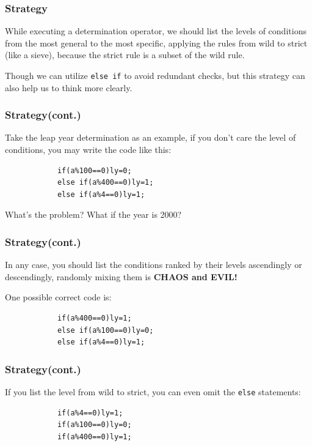\documentclass[xcolor=dvipsnames]{beamer}
\begin{document}
    \begin{frame}
        \frametitle{Strategy}
        While executing a determination operator, we should list the levels of conditions from the most general to the most specific, applying the rules from wild to strict (like a sieve), because the strict rule is a subset of the wild rule.

        Though we can utilize \texttt{else if} to avoid redundant checks, but this strategy can also help us to think more clearly.
    \end{frame}
    \begin{frame}[fragile]
        \frametitle{Strategy(cont.)}
        Take the leap year determination as an example, if you don't care the level of conditions, you may write the code like this:
        \begin{verbatim}
            if(a%100==0)ly=0;
            else if(a%400==0)ly=1;
            else if(a%4==0)ly=1;
        \end{verbatim}
        What's the problem? What if the year is 2000?
    \end{frame}
    \begin{frame}[fragile]
        \frametitle{Strategy(cont.)}
        In any case, you should list the conditions ranked by their levels ascendingly or descendingly, randomly mixing them is \textbf{CHAOS and EVIL!}
        
        One possible correct code is:
        \begin{verbatim}
            if(a%400==0)ly=1;
            else if(a%100==0)ly=0;
            else if(a%4==0)ly=1;
        \end{verbatim}
    \end{frame}
    \begin{frame}[fragile]
        \frametitle{Strategy(cont.)}
        If you list the level from wild to strict, you can even omit the \texttt{else} statements:
        \begin{verbatim}
            if(a%4==0)ly=1;
            if(a%100==0)ly=0;
            if(a%400==0)ly=1;
        \end{verbatim}
    \end{frame}
\end{document}

